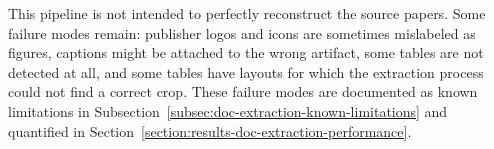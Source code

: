 This pipeline is not intended to perfectly reconstruct the source papers. Some failure modes remain: publisher logos and icons are sometimes mislabeled as figures, captions might be attached to the wrong artifact, some tables are not detected at all, and some tables have layouts for which the extraction process could not find a correct crop. These failure modes are documented as known limitations in Subsection~\ref{subsec:doc-extraction-known-limitations} and quantified in Section~\ref{section:results-doc-extraction-performance}.